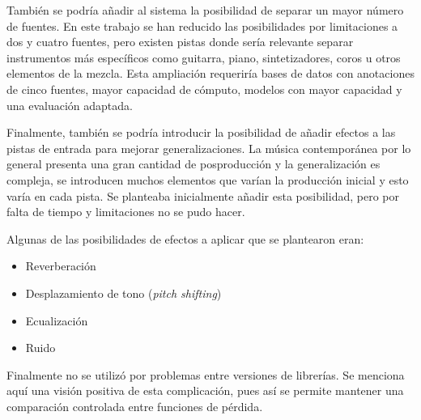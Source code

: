 También se podría añadir al sistema la posibilidad de separar un mayor número de fuentes. En este trabajo se han reducido las posibilidades por limitaciones a dos y cuatro fuentes, pero existen pistas donde sería relevante separar instrumentos más específicos como guitarra, piano, sintetizadores, coros u otros elementos de la mezcla. Esta ampliación requeriría bases de datos con anotaciones
de cinco fuentes, mayor capacidad de cómputo, modelos con mayor capacidad y una evaluación adaptada.

Finalmente, también se podría introducir la posibilidad de añadir efectos a las pistas de entrada para mejorar generalizaciones. La música contemporánea por lo general presenta una gran cantidad de posproducción y la generalización es compleja, se introducen 
muchos elementos que varían la producción inicial y esto varía en cada pista. Se planteaba inicialmente añadir esta posibilidad, pero por falta de tiempo y limitaciones no se pudo hacer. 

Algunas de las posibilidades de efectos a aplicar que se plantearon eran:

\begin{itemize}
    \item Reverberación
    \item Desplazamiento de tono (\textit{pitch shifting})
    \item Ecualización
    \item Ruido
\end{itemize}

Finalmente no se utilizó por problemas entre versiones de librerías. Se menciona aquí una visión positiva de esta complicación, pues así se permite mantener una comparación controlada entre funciones de pérdida.
